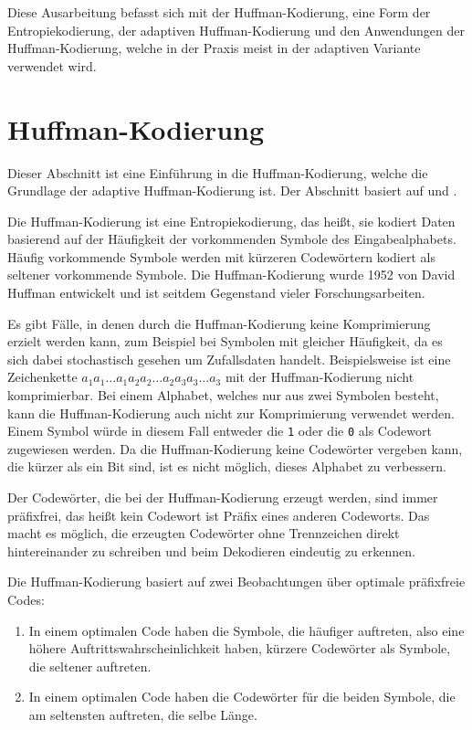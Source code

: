 \documentclass[twoside,11pt,a4paper]{article}
\theoremstyle{break}
\begin{document}
Diese Ausarbeitung befasst sich mit der Huffman-Kodierung, eine Form
der Entropiekodierung, der adaptiven Huffman-Kodierung und den
Anwendungen der Huffman-Kodierung, welche in der Praxis meist in der
adaptiven Variante verwendet wird.

\section{Huffman-Kodierung} \label{sec:huffman}
Dieser Abschnitt ist eine Einführung in die Huffman-Kodierung, welche
die Grundlage der adaptive Huffman-Kodierung ist. Der Abschnitt
basiert auf \cite[S. 211 -- 221]{Salomon:2010} und \cite[S. 41 --
  45]{Sayood:2006}.

Die Huffman-Kodierung ist eine Entropiekodierung, das heißt, sie
kodiert Daten basierend auf der Häufigkeit der vorkommenden Symbole
des Eingabealphabets. Häufig vorkommende Symbole werden mit kürzeren
Codewörtern kodiert als seltener vorkommende Symbole. Die
Huffman-Kodierung wurde 1952 von David Huffman entwickelt und ist
seitdem Gegenstand vieler Forschungsarbeiten.

Es gibt Fälle, in denen durch die Huffman-Kodierung keine
Komprimierung erzielt werden kann, zum Beispiel bei Symbolen mit
gleicher Häufigkeit, da es sich dabei stochastisch gesehen um
Zufallsdaten handelt. Beispielsweise ist eine Zeichenkette
$a_1a_1{\dots}a_1a_2a_2{\dots}a_2a_3a_3{\dots}a_3$ mit der
Huffman-Kodierung nicht komprimierbar. Bei einem Alphabet, welches nur
aus zwei Symbolen besteht, kann die Huffman-Kodierung auch nicht zur
Komprimierung verwendet werden. Einem Symbol würde in diesem Fall
entweder die {\tt1} oder die {\tt0} als Codewort zugewiesen werden.
Da die Huffman-Kodierung keine Codewörter vergeben kann, die kürzer
als ein Bit sind, ist es nicht möglich, dieses Alphabet zu verbessern.

Der Codewörter, die bei der Huffman-Kodierung erzeugt werden, sind
immer präfixfrei, das heißt kein Codewort ist Präfix eines anderen
Codeworts. Das macht es möglich, die erzeugten Codewörter ohne
Trennzeichen direkt hintereinander zu schreiben und beim Dekodieren
eindeutig zu erkennen.

Die Huffman-Kodierung basiert auf zwei Beobachtungen über optimale
präfixfreie Codes:

\begin{enumerate}
\item In einem optimalen Code haben die Symbole, die häufiger
  auftreten, also eine höhere Auftrittswahrscheinlichkeit haben,
  kürzere Codewörter als Symbole, die seltener auftreten.
\item In einem optimalen Code haben die Codewörter für die beiden
  Symbole, die am seltensten auftreten, die selbe Länge.
\end{enumerate}
\end{document}
